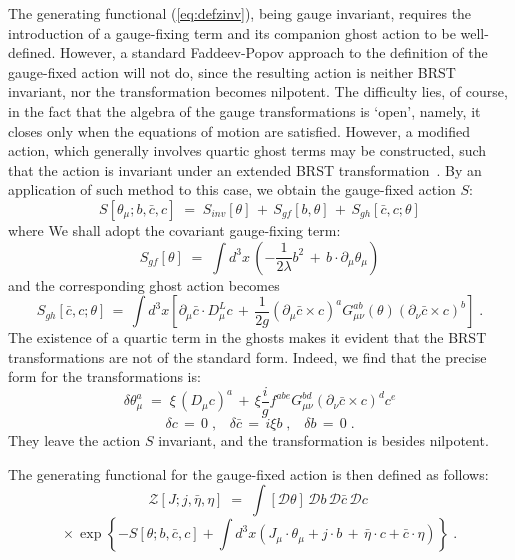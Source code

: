 \documentclass[a4paper,12pt]{article}
\begin{document}
The generating functional (\ref{eq:defzinv}), being gauge invariant,
requires the introduction of a gauge-fixing term and its companion
ghost action to be well-defined. However, a standard Faddeev-Popov
approach to the definition of the gauge-fixed action will not do,
since the resulting action is neither BRST invariant, nor the
transformation becomes nilpotent.  The difficulty lies, of course, in
the fact that the algebra of the gauge transformations is `open',
namely, it closes only when the equations of motion are satisfied.
However, a modified action, which generally involves quartic ghost
terms may be constructed, such that the action is invariant under an
extended BRST transformation~\cite{deWit:1978cd,teit}.  By an application
of such method to this case, we obtain the gauge-fixed action $S$:
\begin{equation}\label{eq:defsfx}
S[\theta_\mu;b,{\bar c}, c] \;=\; S_{inv}[\theta] \,+\,
S_{gf}[b,\theta]\,+\, S_{gh}[{\bar c},c;\theta] 
\end{equation}
where 
We shall adopt the covariant gauge-fixing term:
\begin{equation}\label{eq:defsgf}
S_{gf}[\theta] \;=\; \int d^3x \,( - \frac{1}{2\lambda} b^2
\,+\, b \cdot \partial_\mu \theta_\mu )  
\end{equation}
and the corresponding ghost action becomes
\begin{equation}\label{eq:defsgh}
S_{gh}[{\bar c},c;\theta]\,=\, \int d^3x \left[
\partial_\mu {\bar c} \cdot D_\mu^L c \,+\,
\frac{1}{2g} (\partial_\mu {\bar c} \times c)^a 
G_{\mu\nu}^{ab}(\theta)  (\partial_\nu{\bar c}\times c)^b \right]\;.
\end{equation}
The existence of a quartic term in the ghosts makes it evident that the
BRST transformations are not of the standard form. Indeed, we find
that the precise form for the transformations is:
$$
\delta \theta_\mu^a \;=\; \xi \, (D_\mu c)^a \,+\, \xi \frac{i}{g} f^{abe}
G_{\mu\nu}^{bd} (\partial_\nu {\bar c} \times c)^d c^e 
$$
\begin{equation}\label{eq:defbrst}
\delta c \,=\, 0 \;,\;\;\;
\delta {\bar c} \,=\, i \xi b  \;,\;\;\; 
\delta b \,=\, 0 \;. 
\end{equation} 
They leave the action $S$ invariant, and the transformation is besides 
nilpotent.

The generating functional for the gauge-fixed action is then defined 
as follows:
$$
{\mathcal Z}[J;j, {\bar\eta}, \eta] \;=\; \int [{\mathcal D}\theta]
\,{\mathcal D}b \, {\mathcal D}{\bar c} \, {\mathcal D}c \;
$$
\begin{equation}\label{eq:defztheta}
\times \,\exp \left\{- S[\theta;b, {\bar c}, c] + 
\int d^3x ( J_\mu \cdot \theta_\mu +  j \cdot b \,+\,
{\bar\eta}\cdot c + {\bar c} \cdot \eta  ) \right\} \;.
\end{equation}
\end{document}
